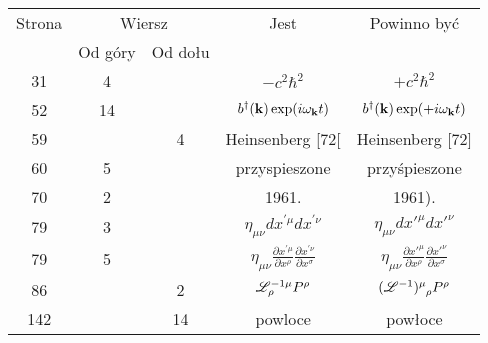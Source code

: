 \documentclass[a4paper,11pt]{article}
\numberwithin{equation}{section}
\begin{document}
\begin{center}

  \begin{tabular}{|c|c|c|c|c|}
    \hline
    Strona & \multicolumn{2}{c|}{Wiersz} & Jest
                              & Powinno być \\ \cline{2-3}
    & Od góry & Od dołu & & \\
    \hline
    31 & 4 & & $-c^{ 2 } \hbar^{ 2 }$ & $+c^{ 2 } \hbar^{ 2 }$ \\
    52 & 14 & & $b^{ \dagger }( \mathbf{k} ) \exp( i \omega_{ \mathbf{k} } t )$
           & $b^{ \dagger }( \mathbf{k} ) \exp( +i \omega_{ \mathbf{k} } t )$ \\
    59 & & 4 & Heinsenberg [72[ & Heinsenberg [72] \\ %
    60 & 5 & & przyspieszone & przyśpieszone \\
    70 & 2 & & 1961. & 1961). \\
    79 & 3 & & $\eta_{ \mu \nu } dx^{ ' \mu } dx^{ ' \nu }$
           & $\eta_{ \mu \nu } dx'^{ \mu } dx'^{ \nu }$ \\
    79 & 5 & & $\eta_{ \mu \nu } \frac{ \partial x^{ ' \mu } }{ \partial x^{ \rho } }
               \frac{ \partial x^{ ' \nu } }{ \partial x^{ \sigma } }$
           & $\eta_{ \mu \nu } \frac{ \partial x'^{ \mu } }{ \partial x^{ \rho } }
             \frac{ \partial x'^{ \nu } }{ \partial x^{ \sigma } }$ \\
    86 & & 2 & $\mathcal{L}_{ \rho }^{ -1 \mu } P^{ \rho }$
           & $\tensor[]{ ( \Lcal^{ -1 } ) }{ ^{ \mu }_{ \rho } } P^{ \rho }$ \\
    142 & & 14 & powloce & powłoce \\
    \hline
  \end{tabular}






\end{center}
\end{document}
